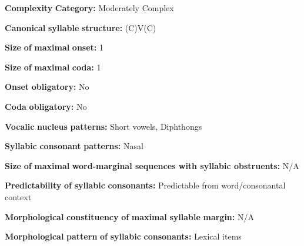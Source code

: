 \documentclass[output=paper]{langsci/langscibook}
\begin{document}
\begin{styleBody}
\textbf{Complexity} \textbf{Category:} Moderately Complex
\end{styleBody}

\begin{styleBody}
\textbf{Canonical} \textbf{syllable} \textbf{structure:} (C)V(C) \citep[32-3]{Peterson2011}
\end{styleBody}

\begin{styleBody}
\textbf{Size} \textbf{of} \textbf{maximal} \textbf{onset:} 1
\end{styleBody}

\begin{styleBody}
\textbf{Size} \textbf{of} \textbf{maximal} \textbf{coda:} 1
\end{styleBody}

\begin{styleBody}
\textbf{Onset} \textbf{obligatory:} No
\end{styleBody}

\begin{styleBody}
\textbf{Coda} \textbf{obligatory:} No
\end{styleBody}

\begin{styleBody}
\textbf{Vocalic} \textbf{nucleus} \textbf{patterns:} Short vowels, Diphthongs
\end{styleBody}

\begin{styleBody}
\textbf{Syllabic} \textbf{consonant} \textbf{patterns:} Nasal
\end{styleBody}

\begin{styleBody}
\textbf{Size} \textbf{of} \textbf{maximal} \textbf{word{}-marginal sequences with syllabic obstruents:} N/A
\end{styleBody}

\begin{styleBody}
\textbf{Predictability} \textbf{of} \textbf{syllabic} \textbf{consonants:} Predictable from word/consonantal context
\end{styleBody}

\begin{styleBody}
\textbf{Morphological} \textbf{constituency} \textbf{of} \textbf{maximal} \textbf{syllable} \textbf{margin:} N/A
\end{styleBody}

\begin{styleBody}
\textbf{Morphological} \textbf{pattern} \textbf{of} \textbf{syllabic} \textbf{consonants:} Lexical items
\end{styleBody}
\end{document}
